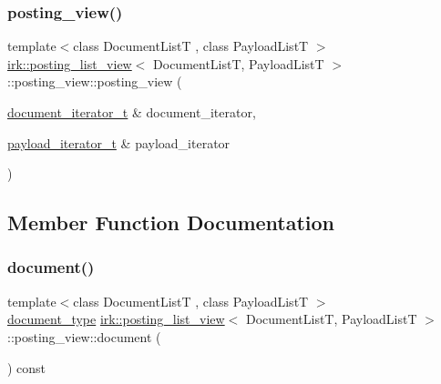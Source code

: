\subsubsection{\texorpdfstring{posting\+\_\+view()}{posting\_view()}}
{\footnotesize\ttfamily template$<$class Document\+ListT , class Payload\+ListT $>$ \\
\mbox{\hyperlink{classirk_1_1posting__list__view}{irk\+::posting\+\_\+list\+\_\+view}}$<$ Document\+ListT, Payload\+ListT $>$\+::posting\+\_\+view\+::posting\+\_\+view (\begin{DoxyParamCaption}\item[{\mbox{\hyperlink{classirk_1_1posting__list__view_abaca622760e6da2c67d55cf35207250f}{document\+\_\+iterator\+\_\+t}} \&}]{document\+\_\+iterator,  }\item[{\mbox{\hyperlink{classirk_1_1posting__list__view_a5a153169348a164ea2cb1a18dc76e279}{payload\+\_\+iterator\+\_\+t}} \&}]{payload\+\_\+iterator }\end{DoxyParamCaption})\hspace{0.3cm}{\ttfamily [inline]}}



\subsection{Member Function Documentation}
\mbox{\label{classirk_1_1posting__list__view_1_1posting__view_a93ff0ec16a30711d2262e8a6372c30fe}} 
\subsubsection{\texorpdfstring{document()}{document()}}
{\footnotesize\ttfamily template$<$class Document\+ListT , class Payload\+ListT $>$ \\
\mbox{\hyperlink{classirk_1_1posting__list__view_ac4615e6e3d8ee1eb9a847b7a34919977}{document\+\_\+type}} \mbox{\hyperlink{classirk_1_1posting__list__view}{irk\+::posting\+\_\+list\+\_\+view}}$<$ Document\+ListT, Payload\+ListT $>$\+::posting\+\_\+view\+::document (\begin{DoxyParamCaption}{ }\end{DoxyParamCaption}) const\hspace{0.3cm}{\ttfamily [inline]}}

